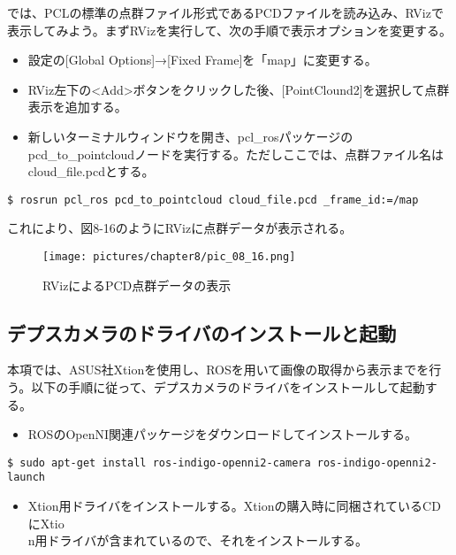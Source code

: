 では、PCLの標準の点群ファイル形式であるPCDファイルを読み込み、RVizで表示してみよう。まずRVizを実行して、次の手順で表示オプションを変更する。

\begin{itemize}
\item 設定の[Global Options]→[Fixed Frame]を「map」に変更する。
\item RViz左下の<Add>ボタンをクリックした後、[PointClound2]を選択して点群表示を追加する。
\item 新しいターミナルウィンドウを開き、pcl\_rosパッケージのpcd\_to\_pointcloudノードを実行する。ただしここでは、点群ファイル名はcloud\_file.pcdとする。
\end{itemize}

\begin{lstlisting}[language=ROS]
$ rosrun pcl_ros pcd_to_pointcloud cloud_file.pcd _frame_id:=/map
\end{lstlisting}

これにより、図8-16のようにRVizに点群データが表示される。

\begin{figure}[htp]
  \centering
  \texttt{[image: pictures/chapter8/pic\_08\_16.png]}
  \caption{RVizによるPCD点群データの表示}
\end{figure}

\subsection{デプスカメラのドライバのインストールと起動}

本項では、ASUS社Xtionを使用し、ROSを用いて画像の取得から表示までを行う。以下の手順に従って、デプスカメラのドライバをインストールして起動する。

\begin{itemize}
\item ROSのOpenNI関連パッケージをダウンロードしてインストールする。
\end{itemize}

\begin{lstlisting}[language=ROS]
$ sudo apt-get install ros-indigo-openni2-camera ros-indigo-openni2-launch
\end{lstlisting}

\begin{itemize}
\item Xtion用ドライバをインストールする。Xtionの購入時に同梱されているCDにXtio\\n用ドライバが含まれているので、それをインストールする。
\end{itemize}

